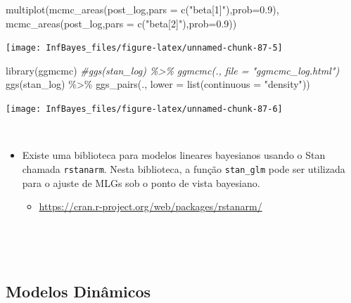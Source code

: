 \documentclass[
]{book}
\newenvironment{Shaded}{\begin{snugshade}}{\end{snugshade}}
\newcommand{\AttributeTok}[1]{\textcolor[rgb]{0.77,0.63,0.00}{#1}}
\newcommand{\CommentTok}[1]{\textcolor[rgb]{0.56,0.35,0.01}{\textit{#1}}}
\newcommand{\FloatTok}[1]{\textcolor[rgb]{0.00,0.00,0.81}{#1}}
\newcommand{\FunctionTok}[1]{\textcolor[rgb]{0.00,0.00,0.00}{#1}}
\newcommand{\NormalTok}[1]{#1}
\newcommand{\SpecialCharTok}[1]{\textcolor[rgb]{0.00,0.00,0.00}{#1}}
\newcommand{\StringTok}[1]{\textcolor[rgb]{0.31,0.60,0.02}{#1}}
\providecommand{\tightlist}{%
  \setlength{\itemsep}{0pt}\setlength{\parskip}{0pt}}
\begin{document}
\begin{Shaded}
\begin{Highlighting}[]
\FunctionTok{multiplot}\NormalTok{(}\FunctionTok{mcmc\_areas}\NormalTok{(post\_log,}\AttributeTok{pars =} \FunctionTok{c}\NormalTok{(}\StringTok{"beta[1]"}\NormalTok{),}\AttributeTok{prob=}\FloatTok{0.9}\NormalTok{),}
          \FunctionTok{mcmc\_areas}\NormalTok{(post\_log,}\AttributeTok{pars =} \FunctionTok{c}\NormalTok{(}\StringTok{"beta[2]"}\NormalTok{),}\AttributeTok{prob=}\FloatTok{0.9}\NormalTok{))}
\end{Highlighting}
\end{Shaded}

\begin{center}\texttt{[image: InfBayes\_files/figure-latex/unnamed-chunk-87-5]} \end{center}

\begin{Shaded}
\begin{Highlighting}[]
\FunctionTok{library}\NormalTok{(ggmcmc)}
\CommentTok{\#ggs(stan\_log) \%\textgreater{}\% ggmcmc(., file = "ggmcmc\_log.html")}
\FunctionTok{ggs}\NormalTok{(stan\_log) }\SpecialCharTok{\%\textgreater{}\%} \FunctionTok{ggs\_pairs}\NormalTok{(., }\AttributeTok{lower =} \FunctionTok{list}\NormalTok{(}\AttributeTok{continuous =} \StringTok{"density"}\NormalTok{))}
\end{Highlighting}
\end{Shaded}

\begin{center}\texttt{[image: InfBayes\_files/figure-latex/unnamed-chunk-87-6]} \end{center}

\(~\)

\begin{itemize}
\item
  Existe uma biblioteca para modelos lineares bayesianos usando o Stan chamada \texttt{rstanarm}. Nesta biblioteca, a função \texttt{stan\_glm} pode ser utilizada para o ajuste de MLGs sob o ponto de vista bayesiano.

  \begin{itemize}
  \tightlist
  \item
    \url{https://cran.r-project.org/web/packages/rstanarm/}
  \end{itemize}
\end{itemize}

\(~\)

\(~\)

\hypertarget{modelos-dinuxe2micos}{%
\subsection{Modelos Dinâmicos}\label{modelos-dinuxe2micos}}
\end{document}

